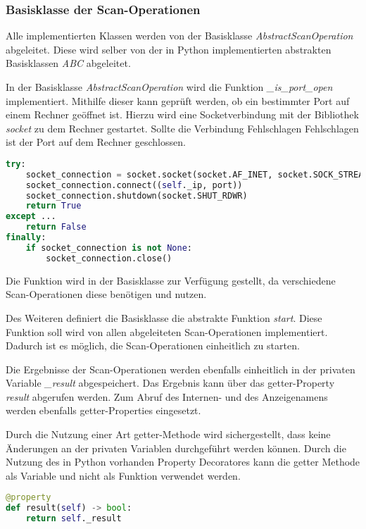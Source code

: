 \subsubsection{Basisklasse der Scan-Operationen}

Alle implementierten Klassen werden von der Basisklasse \textit{AbstractScanOperation} abgeleitet. Diese wird selber von der in Python implementierten abstrakten Basisklassen \textit{ABC} abgeleitet.

In der Basisklasse \textit{AbstractScanOperation} wird die Funktion \textit{\_is\_port\_open} implementiert. Mithilfe dieser kann geprüft werden, ob ein bestimmter Port auf einem Rechner geöffnet ist. Hierzu wird eine Socketverbindung mit der Bibliothek \textit{socket} zu dem Rechner gestartet. Sollte die Verbindung Fehlschlagen Fehlschlagen ist der Port auf dem Rechner geschlossen.

\begin{lstlisting}[language=Python, frame=single, caption={Big Brother Funktion is\_port\_open}, captionpos=b, label={lst:bigbrother-port-open}]
try:
	socket_connection = socket.socket(socket.AF_INET, socket.SOCK_STREAM)
	socket_connection.connect((self._ip, port))
	socket_connection.shutdown(socket.SHUT_RDWR)
	return True
except ...
	return False
finally:
	if socket_connection is not None:
		socket_connection.close()
\end{lstlisting}

Die Funktion wird in der Basisklasse zur Verfügung gestellt, da verschiedene Scan-Operationen diese benötigen und nutzen.

Des Weiteren definiert die Basisklasse die abstrakte Funktion \textit{start}. Diese Funktion soll wird von allen abgeleiteten Scan-Operationen implementiert. Dadurch ist es möglich, die Scan-Operationen einheitlich zu starten.

Die Ergebnisse der Scan-Operationen werden ebenfalls einheitlich in der privaten Variable \textit{\_result} abgespeichert. Das Ergebnis kann über das getter-Property \textit{result} abgerufen werden. Zum Abruf des Internen- und des Anzeigenamens werden ebenfalls getter-Properties eingesetzt. 

Durch die Nutzung einer Art getter-Methode wird sichergestellt, dass keine Änderungen an der privaten Variablen durchgeführt werden können. Durch die Nutzung des in Python vorhanden Property Decoratores kann die getter Methode als Variable und nicht als Funktion verwendet werden.

\begin{lstlisting}[language=Python, frame=single, caption={Big Brother Ergebniss getter-Property}, captionpos=b, label={lst:bigbrother-getter-result}]
@property
def result(self) -> bool:
	return self._result
\end{lstlisting}

